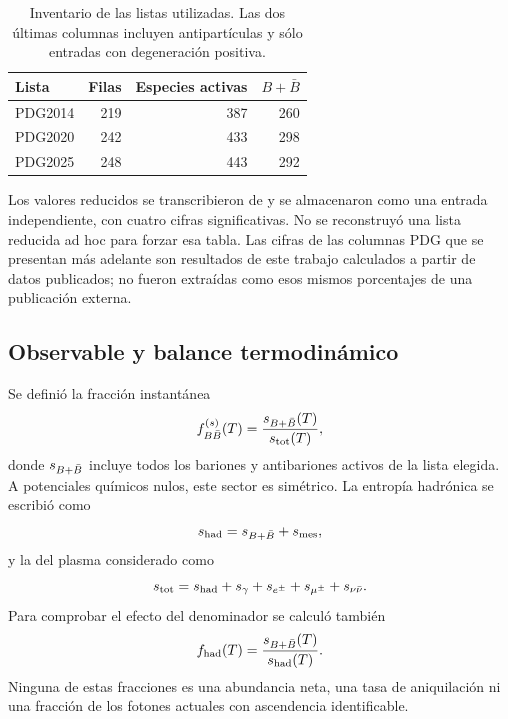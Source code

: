 \begin{table}[t]
\centering\small
\caption{Inventario de las listas utilizadas. Las dos últimas columnas incluyen antipartículas y sólo entradas con degeneración positiva.}
\label{tab:inventory}
\setlength{\tabcolsep}{4pt}
\begin{tabular}{lrrr}\toprule
Lista & Filas & Especies activas & $B+\bar B$\\\midrule
PDG2014 & 219 & 387 & 260\\
PDG2020 & 242 & 433 & 298\\
PDG2025 & 248 & 443 & 292\\
\bottomrule\end{tabular}
\end{table}

Los valores reducidos se transcribieron de \citet{Garcia2026} y se almacenaron como una entrada independiente, con cuatro cifras significativas. No se reconstruyó una lista reducida ad hoc para forzar esa tabla. Las cifras de las columnas PDG que se presentan más adelante son resultados de este trabajo calculados a partir de datos publicados; no fueron extraídas como esos mismos porcentajes de una publicación externa.

\subsection{Observable y balance termodinámico}
Se definió la fracción instantánea
\begin{equation}
f^{(s)}_{B\bar B}(T)=\frac{s_{B+\bar B}(T)}{s_{\mathrm{tot}}(T)},
\label{eq:f}
\end{equation}
donde $s_{B+\bar B}$ incluye todos los bariones y antibariones activos de la lista elegida. A potenciales químicos nulos, este sector es simétrico. La entropía hadrónica se escribió como
\begin{equation}
s_{\mathrm{had}}=s_{B+\bar B}+s_{\rm mes},
\end{equation}
y la del plasma considerado como
\begin{equation}
s_{\mathrm{tot}}=s_{\mathrm{had}}+s_\gamma+s_{e^\pm}+s_{\mu^\pm}+s_{\nu\bar\nu}.
\label{eq:den}
\end{equation}
Para comprobar el efecto del denominador se calculó también
\begin{equation}
f_{\rm had}(T)=\frac{s_{B+\bar B}(T)}{s_{\mathrm{had}}(T)}.
\label{eq:fhad}
\end{equation}
Ninguna de estas fracciones es una abundancia neta, una tasa de aniquilación ni una fracción de los fotones actuales con ascendencia identificable.

